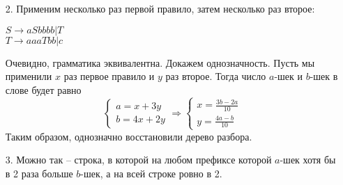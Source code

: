 \documentclass[12pt]{article}
\begin{document}
\bigskip

\begin{enumerate}
\item[2.] Применим несколько раз первой правило, затем несколько раз второе:
\begin{myquote}
$S \to aSbbbb |  T$\\
$T \to aaaTbb | c$
\end{myquote}
Очевидно, грамматика эквивалентна. Докажем однозначность. Пусть мы применили $x$ раз первое правило и $y$ раз второе. Тогда число $a$-шек и $b$-шек в слове будет равно\\
\begin{equation*}
 \begin{cases}
  a = x + 3y\\
  b = 4x + 2y
 \end{cases}
\Rightarrow
 \begin{cases}
   x = \frac{3b-2a}{10}\\
   y = \frac{4a-b}{10}
 \end{cases}
\end{equation*}
Таким образом, однозначно восстановили дерево разбора.
\item[3.] Можно так -- строка, в которой на любом префиксе которой $a$-шек хотя бы в 2 раза больше $b$-шек, а на всей строке ровно в 2.
\end{enumerate}
\end{document}
